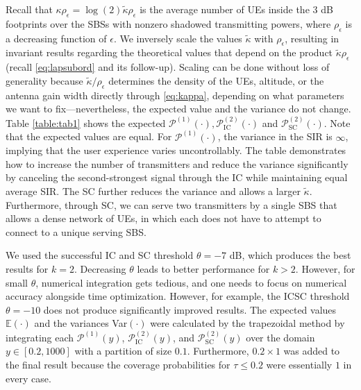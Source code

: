 \documentclass[lettersize,journal]{IEEEtran}
\begin{document}
Recall that $ \kappa \rho_{\epsilon}=\log(2)\tilde{\kappa} \rho_{\epsilon} $ is the average number of UEs inside the $3$ dB footprints over the SBSs with nonzero shadowed transmitting powers, where $\rho_{\epsilon}$ is a decreasing function of $\epsilon$. We inversely scale the values $\tilde{\kappa}$ with $\rho_{\epsilon}$, resulting in invariant results regarding the theoretical values that depend on the product $\tilde{\kappa} \rho_{\epsilon}$ (recall \eqref{eq:lapsubord} and its follow-up). Scaling can be done without loss of generality because $\tilde{\kappa}/\rho_{\epsilon}$ determines the density of the UEs, altitude, or the antenna gain width directly through \eqref{eq:kappa}, depending on what parameters we want to fix---nevertheless, the expected value and the variance do not change. Table \ref{table:tab1} shows the expected $\mathcal{P}^{(1)}(\cdot), \mathcal{P}^{(2)}_{\text{IC}}(\cdot) $ and $\mathcal{P}^{(2)}_{\text{SC}}(\cdot)$. Note that the expected values are equal. For $\mathcal{P}^{(1)}(\cdot)$, the variance in the SIR is $\infty$, implying that the user experience varies uncontrollably. The table demonstrates how to increase the number of transmitters and reduce the variance significantly by canceling the second-strongest signal through the IC while maintaining equal average SIR. The SC further reduces the variance and allows a larger $\tilde{\kappa}$. Furthermore, through SC, we can serve two transmitters by a single SBS that allows a dense network of UEs, in which each does not have to attempt to connect to a unique serving SBS. 




We used the successful IC and SC threshold $\theta = -7$ dB, which produces the best results for $k=2$. Decreasing $\theta$ leads to better performance for $k>2$. However, for small $\theta$, numerical integration gets tedious, and one needs to focus on numerical accuracy alongside time optimization. However, for example, the ICSC threshold  $\theta = -10$ does not produce significantly improved results. The expected values $\mathbb{E}(\cdot)$ and the variances Var$(\cdot)$  were calculated by the trapezoidal method by integrating each $\mathcal{P}^{(1)}(y)$, $\mathcal{P}^{(2)}_{\text{IC}}(y)$, and $\mathcal{P}^{(2)}_{\text{SC}}(y)$ over the domain $y \in [0.2, 1000]$ with a partition of size $0.1$. Furthermore, $0.2 \times 1$ was added to the final result because the coverage probabilities for $\tau \leq 0.2$ were essentially $1$ in every case. 

\appendices
\end{document}
